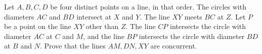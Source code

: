 Let $ A,B,C,D$ be four distinct points on a line, in that order.  The circles with diameters $ AC$ and $ BD$ intersect at $ X$ and $ Y$. The line $ XY$ meets $ BC$ at $ Z$. Let $ P$ be a point on the line $ XY$ other than $ Z$. The line $ CP$ intersects the circle with diameter $ AC$ at $ C$ and $ M$, and the line $ BP$ intersects the circle with diameter $ BD$ at $ B$ and $ N$. Prove that the lines $ AM,DN,XY$ are concurrent.
